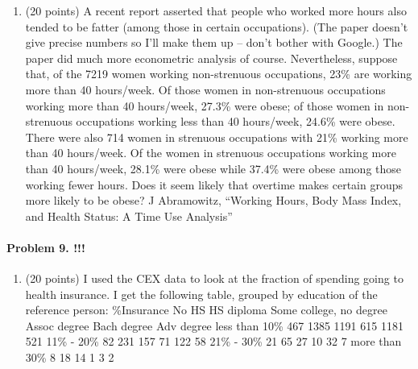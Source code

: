 \documentclass[]{article}
\providecommand{\tightlist}{%
  \setlength{\itemsep}{0pt}\setlength{\parskip}{0pt}}
\let\oldparagraph\paragraph
\renewcommand{\paragraph}[1]{\oldparagraph{#1}\mbox{}}
\begin{document}
\begin{enumerate}
\def\labelenumi{\arabic{enumi}.}
\setcounter{enumi}{13}
\tightlist
\item
  (20 points) A recent report asserted that people who worked more hours
  also tended to be fatter (among those in certain occupations). (The
  paper doesn't give precise numbers so I'll make them up -- don't
  bother with Google.) The paper did much more econometric analysis of
  course. Nevertheless, suppose that, of the 7219 women working
  non-strenuous occupations, 23\% are working more than 40 hours/week.
  Of those women in non-strenuous occupations working more than 40
  hours/week, 27.3\% were obese; of those women in non-strenuous
  occupations working less than 40 hours/week, 24.6\% were obese. There
  were also 714 women in strenuous occupations with 21\% working more
  than 40 hours/week. Of the women in strenuous occupations working more
  than 40 hours/week, 28.1\% were obese while 37.4\% were obese among
  those working fewer hours. Does it seem likely that overtime makes
  certain groups more likely to be obese? J Abramowitz, ``Working Hours,
  Body Mass Index, and Health Status: A Time Use Analysis''
\end{enumerate}

\paragraph{Problem 9. !!!}\label{problem-9.}

\begin{enumerate}
\def\labelenumi{\arabic{enumi}.}
\setcounter{enumi}{14}
\tightlist
\item
  (20 points) I used the CEX data to look at the fraction of spending
  going to health insurance. I get the following table, grouped by
  education of the reference person: \%Insurance No HS HS diploma Some
  college, no degree Assoc degree Bach degree Adv degree less than 10\%
  467 1385 1191 615 1181 521 11\% - 20\% 82 231 157 71 122 58 21\% -
  30\% 21 65 27 10 32 7 more than 30\% 8 18 14 1 3 2
\end{enumerate}
\end{document}
